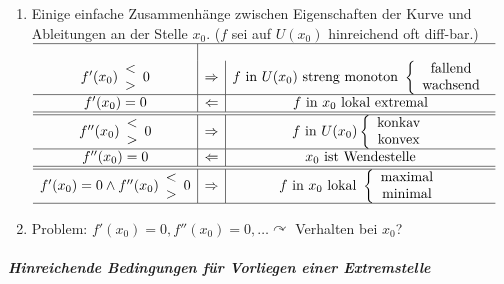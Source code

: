 \documentclass[a4paper]{scrartcl}
\begin{document}
\begin{enumerate}
\begin{itemize}
\end{itemize}
\item Einige einfache Zusammenhänge zwischen Eigenschaften der Kurve und Ableitungen an der Stelle $x_0$. ($f$ sei auf $U(x_0)$ hinreichend oft diff-bar.)\\
$\begin{array}{c|c|c} \hline\\
f'(x_0) \begin{array}{c} < \\ >\\\end{array} 0 & \Rightarrow & f \text{ in } U(x_0) \text{ streng monoton } \left\{ \begin{array}{c} \text{fallend} \\ \text{wachsend}\end{array} \right.\\ \hline 
f'(x_0) = 0 & \Leftarrow & f \text{ in } x_0 \text{ lokal extremal}\\ \hline \hline
f''(x_0) \begin{array}{c} < \\ >\\\end{array} 0 & \Rightarrow & f \text{ in } U(x_0) \left\{ \begin{array}{c} \text{konkav} \\ \text{konvex}\\\end{array} \right.\\ \hline
f''(x_0) = 0 & \Leftarrow & x_0 \text{ ist Wendestelle}\\ \hline \hline
f'(x_0) = 0 \wedge f''(x_0) \begin{array}{c} < \\ >\\\end{array} 0 & \Rightarrow & f \text{ in } x_0 \text{ lokal } \left\{ \begin{array}{c} \text{maximal} \\ \text{minimal} \end{array} \right.\\ \hline
\end{array}$
\item Problem: $f'(x_0) = 0, f''(x_0) = 0, \dots \curvearrowright$ Verhalten bei $x_0$?
\end{enumerate}

\subparagraph{Hinreichende Bedingungen für Vorliegen einer Extremstelle}
\end{document}

